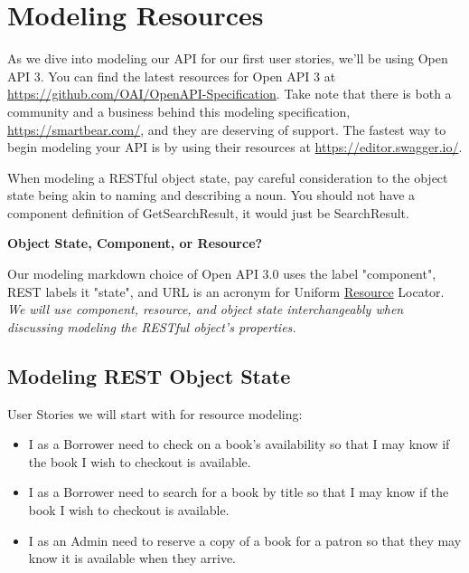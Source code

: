 \chapter{Modeling Resources}

As we dive into modeling our API for our first user stories, we'll be using Open API 3.  You can find the latest resources for Open API 3 at \url{https://github.com/OAI/OpenAPI-Specification}.  Take note that there is both a community and a business behind this modeling specification, \url{https://smartbear.com/}, and they are deserving of support.  The fastest way to begin modeling your API is by using their resources at \url{https://editor.swagger.io/}.

When modeling a RESTful object state, pay careful consideration to the object state being akin to naming and describing a noun.  You should not have a component definition of GetSearchResult, it would just be SearchResult.

\begin{sidebar}
\begin{center}
\textbf{Object State, Component, or Resource?}
\end{center}

Our modeling markdown choice of Open API 3.0 uses the label "component", REST labels it "state", and URL is an acronym for Uniform \underline{Resource} Locator.  \textit{We will use component, resource, and object state interchangeably when discussing modeling the RESTful object's properties.}

\end{sidebar}

\section{Modeling REST Object State}

User Stories we will start with for resource modeling:

\begin{itemize}
  \item I as a Borrower need to check on a book's availability so that I may know if the book I wish to checkout is available.
  \item I as a Borrower need to search for a book by title so that I may know if the book I wish to checkout is available.
  \item I as an Admin need to reserve a copy of a book for a patron so that they may know it is available when they arrive.
\end{itemize}


